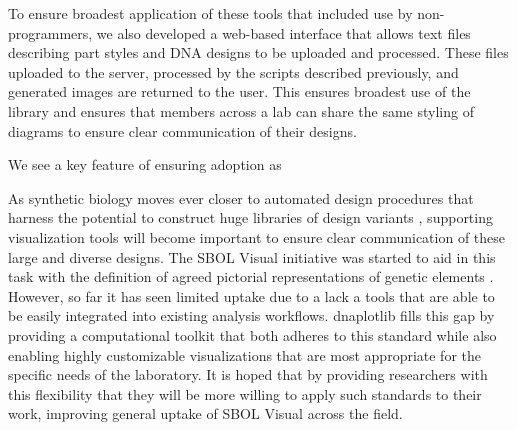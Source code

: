 \documentclass{bioinfo}
\begin{document}

To ensure broadest application of these tools that included use by non-programmers, we also developed a web-based interface that allows text files describing part styles and DNA designs to be uploaded and processed. These files uploaded to the server, processed by the scripts described previously, and generated images are returned to the user. This ensures broadest use of the library and ensures that members across a lab can share the same styling of diagrams to ensure clear communication of their designs.

We see a key feature of ensuring adoption as 


As synthetic biology moves ever closer to automated design procedures that harness the potential to construct huge libraries of design variants \citep{Smanski14a,Bilitchenko11a}, supporting visualization tools will become important to ensure clear communication of these large and diverse designs. The SBOL Visual initiative was started to aid in this task with the definition of agreed pictorial representations of genetic elements \citep{Quinn13a}. However, so far it has seen limited uptake due to a lack a tools that are able to be easily integrated into existing analysis workflows. dnaplotlib fills this gap by providing a computational toolkit that both adheres to this standard while also enabling highly customizable visualizations that are most appropriate for the specific needs of the laboratory. It is hoped that by providing researchers with this flexibility that they will be more willing to apply such standards to their work, improving general uptake of SBOL Visual across the field.
\end{document}
